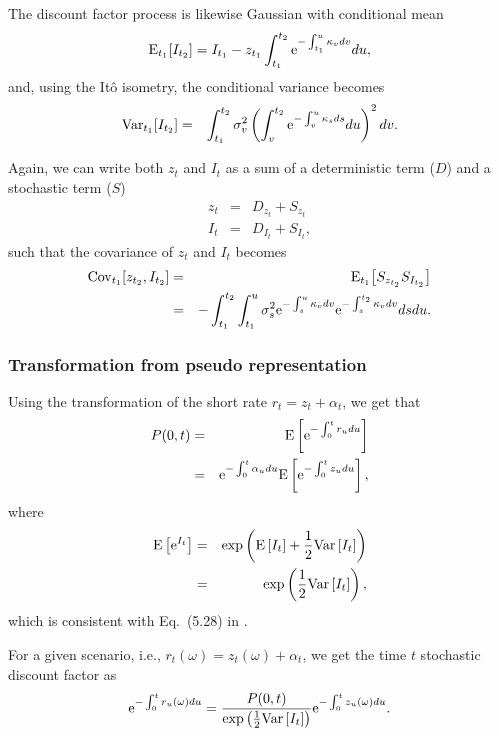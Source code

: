 The discount factor process is likewise Gaussian with conditional mean
\begin{equation}
\mathrm{E}_{t_1}\! \left[ I_{t_{2}} \right] = I_{t_1} - z_{t_1} \int_{t_1}^{t_2} \text{e}^{-\int_{t_1}^{u} \kappa_v dv} du,
\end{equation}
and, using the It\^{o} isometry, the conditional variance becomes
\begin{eqnarray}
\mathrm{Var}_{t_1}\! \left[ I_{t_{2}} \right] &=& \int_{t_1}^{t_2} \sigma_v^2 \left( \int_{v}^{t_2} \text{e}^{-\int_v^{u} \kappa_s ds} du \right)^2 dv.
\end{eqnarray}

Again, we can write both $z_t$ and $I_t$ as a sum of a deterministic term ($D$) and a stochastic term ($S$)
\begin{eqnarray}
z_t &=& D_{z_t} + S_{z_t} \\
I_t &=& D_{I_t} + S_{I_t},
\end{eqnarray}
such that the covariance of $z_t$ and $I_t$ becomes
\begin{eqnarray}
\mathrm{Cov}_{t_1}\! \left[ z_{t_2}, I_{t_2} \right] &=& \mathrm{E}_{t_1}\! \left[ S_{z_{t_2}} S_{I_{t_2}} \right] \\
&=& - \int_{t_1}^{t_2} \int_{t_1}^u \sigma_s^2 \text{e}^{-\int_s^{u} \kappa_v dv} \text{e}^{-\int_s^{t_2} \kappa_v dv} ds du.
\end{eqnarray}

\subsubsection{Transformation from pseudo representation}

Using the transformation of the short rate $r_t = z_t + \alpha_t$, we get that
\begin{eqnarray}
P(0,t) &=& \mathrm{E} \left[ \text{e}^{- \int_0^t r_u du} \right] \\
&=& \text{e}^{- \int_0^t \alpha_u du} \mathrm{E} \left[ \text{e}^{- \int_0^t z_u du} \right],
\end{eqnarray}
where
\begin{eqnarray}
\mathrm{E} \left[ \text{e}^{I_t} \right] &=& \exp \left( \mathrm{E} \left[ I_t \right] + \frac{1}{2} \mathrm{Var} \left[ I_t \right] \right) \\
&=& \exp \left(\frac{1}{2} \mathrm{Var} \left[ I_t \right] \right),
\end{eqnarray}
which is consistent with Eq.~(5.28) in \cite{Pelsser2000}.

For a given scenario, i.e., $r_t(\omega) = z_t (\omega) + \alpha_t$, we get the 
time $t$ stochastic discount factor as
\begin{equation}
\text{e}^{- \int_0^t r_u (\omega) du} = \frac{P(0,t)}{\exp \left(\frac{1}{2} \mathrm{Var} \left[ I_t \right] \right)} \text{e}^{- \int_0^t z_u (\omega) du}.
\end{equation}
